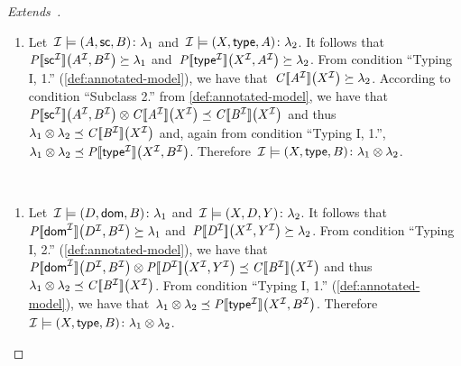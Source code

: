 \begin{proof}[Extends~\citep{MunozPerezGutierrez:2009aa}]
\begin{description}[nosep]
\begin{enumerate}[label=(\alph*),nosep]
    \item Let~$\mathcal{I} \models \mbox{$(A, \mathsf{sc}, B)\colon\lambda_{1}$}$ and~$\mathcal{I} \models \mbox{$(X, \mathsf{type},
          A)\colon\lambda_{2}$}$.
      It follows that~$\mathit{{P[\![{\mathsf{sc}}^{\mathcal{I}}]\!]}}\!\left({A}^{\mathcal{I}}, {B}^{\mathcal{I}}\right) \succeq \lambda_{1}$
      and~$\mathit{{P[\![{\mathsf{type}}^{\mathcal{I}}]\!]}}\!\left({X}^{\mathcal{I}}, {A}^{\mathcal{I}}\right) \succeq \lambda_{2}$.
      From condition ``Typing I, 1.'' (\cref{def:annotated-model}), we have that~$\mathit{{C[\![{A}^{\mathcal{I}}]\!]}}\!\left({X}^{\mathcal{I}}\right) \succeq
      \lambda_{2}$.
      According to condition ``Subclass 2.'' from \cref{def:annotated-model}, we have
      that~$\fc{\intP{\int{\subclass}}}{\int{A}, \int{B}} \otimes \fc{\intC{\int{A}}}{\int{X}} \preceq
      \fc{\intC{\int{B}}}{\int{X}}$ and thus~$\lambda_{1} \otimes \lambda_{2} \preceq \mathit{{C[\![{B}^{\mathcal{I}}]\!]}}\!\left({X}^{\mathcal{I}}\right)$ and,
      again from condition ``Typing I, 1.'', $\lambda_{1} \otimes \lambda_{2} \preceq \mathit{{P[\![{\mathsf{type}}^{\mathcal{I}}]\!]}}\!\left({X}^{\mathcal{I}}, {B}^{\mathcal{I}}\right)$.
      Therefore~$\mathcal{I} \models \mbox{$(X, \mathsf{type}, B)\colon\lambda_{1}\otimes\lambda_{2}$}$.
      


    \end{enumerate}
  \item[4. Typing:]~ 
    \begin{enumerate}[label=(\alph*),nosep]
    \item Let~$\mathcal{I} \models \mbox{$(D, \mathsf{dom}, B)\colon\lambda_{1}$}$ and~$\mathcal{I} \models \mbox{$(X, D,
          Y)\colon\lambda_{2}$}$.
      It follows that~$\mathit{{P[\![{\mathsf{dom}}^{\mathcal{I}}]\!]}}\!\left({D}^{\mathcal{I}}, {B}^{\mathcal{I}}\right) \succeq \lambda_{1}$
      and~$\mathit{{P[\![{D}^{\mathcal{I}}]\!]}}\!\left({X}^{\mathcal{I}}, {Y}^{\mathcal{I}}\right) \succeq \lambda_{2}$.
      From condition ``Typing I, 2.'' (\cref{def:annotated-model}), we have that~$\fc{\intP{\int{\domR}}}{\int{D},
        \int{B}} \otimes \fc{\intP{\int{D}}}{\int{X}, \int{Y}} \preceq \fc{\intC{\int{B}}}{\int{X}}$ and
      thus~$\lambda_{1} \otimes \lambda_{2} \preceq \mathit{{C[\![{B}^{\mathcal{I}}]\!]}}\!\left({X}^{\mathcal{I}}\right)$.
      From condition ``Typing I, 1.'' (\cref{def:annotated-model}), we have that~$\lambda_{1} \otimes \lambda_{2}
      \preceq \mathit{{P[\![{\mathsf{type}}^{\mathcal{I}}]\!]}}\!\left({X}^{\mathcal{I}},{B}^{\mathcal{I}}\right)$.
      Therefore~$\mathcal{I} \models \mbox{$(X, \mathsf{type}, B)\colon\lambda_{1} \otimes \lambda_{2}$}$.


\end{enumerate}
\end{description}
\end{proof}
